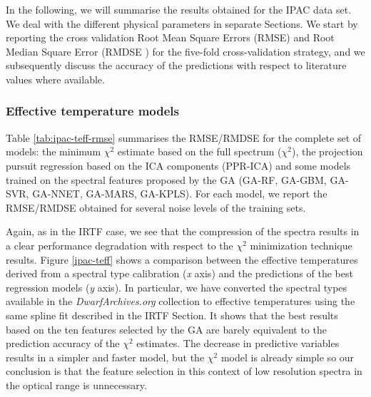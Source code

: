 
In the following, we will summarise the results obtained for the IPAC
data set. We deal with the different physical parameters in separate
Sections. We start by reporting the cross validation Root Mean Square
Errors (RMSE) and Root Median Square Error (RMDSE ) for the five-fold
cross-validation strategy, and we subsequently discuss the accuracy of
the predictions with respect to literature values where available.

\subsubsection{Effective temperature models}

Table \ref{tab:ipac-teff-rmse} summarises the RMSE/RMDSE for the
complete set of models: the minimum $\chi^2$ estimate based on the
full spectrum ($\chi^2$), the projection pursuit regression based on
the ICA components (PPR-ICA) and some models trained on the spectral
features proposed by the GA (GA-RF, GA-GBM, GA-SVR, GA-NNET, GA-MARS,
GA-KPLS). For each model, we report the RMSE/RMDSE obtained for
several noise levels of the training sets.

Again, as in the IRTF case, we see that the compression of the spectra
results in a clear performance degradation with respect to the
$\chi^2$ minimization technique results. Figure \ref{ipac-teff} shows
a comparison between the effective temperatures derived from a
spectral type calibration ({\it x} axis) and the predictions of the
best regression models ({\it y} axis). In particular, we have
converted the spectral types available in the {\it DwarfArchives.org}
collection to effective temperatures using the same spline fit
described in the IRTF Section. It shows that the best results based on
the ten features selected by the GA are barely equivalent to the
prediction accuracy of the $\chi^2$ estimates. The decrease in
predictive variables results in a simpler and faster model, but the
$\chi^2$ model is already simple so our conclusion is that the feature
selection in this context of low resolution spectra in the optical
range is unnecessary.


